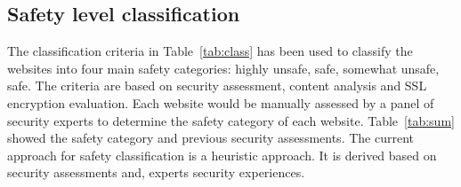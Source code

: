 \documentclass[conference]{IEEEtran}
\begin{document}
\subsection{Safety level classification}

The classification criteria in Table~\ref{tab:class} has been used to classify the websites into four main safety categories: highly unsafe, safe, somewhat unsafe, safe. The criteria are based on security assessment, content analysis and SSL encryption evaluation. Each website would be manually assessed by a panel of security experts to determine the safety category of each website. Table~\ref{tab:sum} showed the safety category and previous security assessments. The current approach for safety classification is a heuristic approach. It is derived based on security assessments and, experts security experiences.
\end{document}
